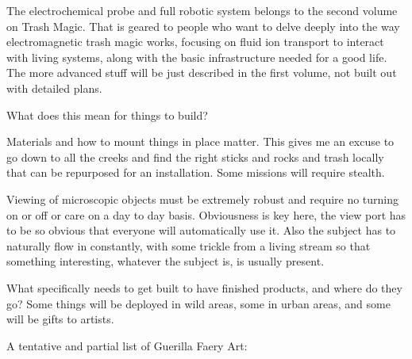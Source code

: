 The electrochemical probe and full robotic system belongs to the second
volume on Trash Magic. That is geared to people who want to delve deeply
into the way electromagnetic trash magic works, focusing on fluid ion
transport to interact with living systems, along with the basic
infrastructure needed for a good life. The more advanced stuff will be
just described in the first volume, not built out with detailed plans.

What does this mean for things to build?

Materials and how to mount things in place matter. This gives me an
excuse to go down to all the creeks and find the right sticks and rocks
and trash locally that can be repurposed for an installation. Some
missions will require stealth.

Viewing of microscopic objects must be extremely robust and require no
turning on or off or care on a day to day basis. Obviousness is key
here, the view port has to be so obvious that everyone will
automatically use it. Also the subject has to naturally flow in
constantly, with some trickle from a living stream so that something
interesting, whatever the subject is, is usually present.

What specifically needs to get built to have finished products, and
where do they go? Some things will be deployed in wild areas, some in
urban areas, and some will be gifts to artists.

A tentative and partial list of Guerilla Faery Art:

